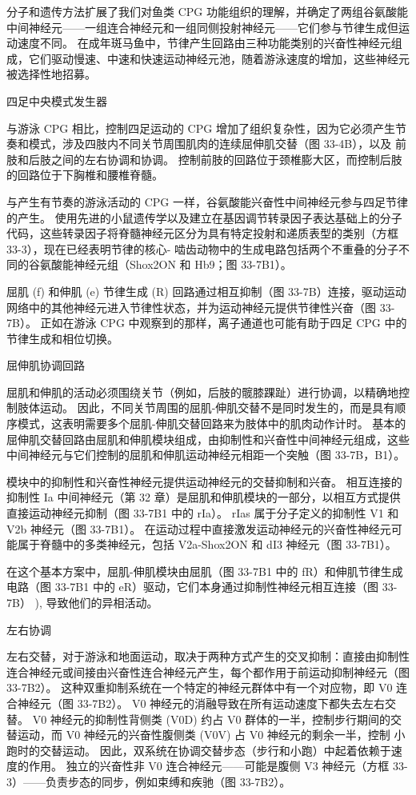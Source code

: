 分子和遗传方法扩展了我们对鱼类 CPG 功能组织的理解，并确定了两组谷氨酸能中间神经元——一组连合神经元和一组同侧投射神经元——它们参与节律生成但运动速度不同。 在成年斑马鱼中，节律产生回路由三种功能类别的兴奋性神经元组成，它们驱动慢速、中速和快速运动神经元池，随着游泳速度的增加，这些神经元被选择性地招募。

四足中央模式发生器

与游泳 CPG 相比，控制四足运动的 CPG 增加了组织复杂性，因为它必须产生节奏和模式，涉及四肢内不同关节周围肌肉的连续屈伸肌交替（图 33-4B），以及 前肢和后肢之间的左右协调和协调。 控制前肢的回路位于颈椎膨大区，而控制后肢的回路位于下胸椎和腰椎脊髓。

与产生有节奏的游泳活动的 CPG 一样，谷氨酸能兴奋性中间神经元参与四足节律的产生。 使用先进的小鼠遗传学以及建立在基因调节转录因子表达基础上的分子代码，这些转录因子将脊髓神经元区分为具有特定投射和递质表型的类别（方框 33-3），现在已经表明节律的核心- 啮齿动物中的生成电路包括两个不重叠的分子不同的谷氨酸能神经元组（Shox2ON 和 Hb9；图 33-7B1）。

屈肌 (f) 和伸肌 (e) 节律生成 (R) 回路通过相互抑制（图 33-7B）连接，驱动运动网络中的其他神经元进入节律性状态，并为运动神经元提供节律性兴奋（图 33-7B）。 正如在游泳 CPG 中观察到的那样，离子通道也可能有助于四足 CPG 中的节律生成和相位切换。

屈伸肌协调回路

屈肌和伸肌的活动必须围绕关节（例如，后肢的髋膝踝趾）进行协调，以精确地控制肢体运动。 因此，不同关节周围的屈肌-伸肌交替不是同时发生的，而是具有顺序模式，这表明需要多个屈肌-伸肌交替回路来为肢体中的肌肉动作计时。 基本的屈伸肌交替回路由屈肌和伸肌模块组成，由抑制性和兴奋性中间神经元组成，这些中间神经元与它们控制的屈肌和伸肌运动神经元相距一个突触（图 33-7B，B1）。

模块中的抑制性和兴奋性神经元提供运动神经元的交替抑制和兴奋。 相互连接的抑制性 Ia 中间神经元（第 32 章）是屈肌和伸肌模块的一部分，以相互方式提供直接运动神经元抑制（图 33-7B1 中的 rIa）。 rIas 属于分子定义的抑制性 V1 和 V2b 神经元（图 33-7B1）。 在运动过程中直接激发运动神经元的兴奋性神经元可能属于脊髓中的多类神经元，包括 V2a-Shox2ON 和 dI3 神经元（图 33-7B1）。

在这个基本方案中，屈肌-伸肌模块由屈肌（图 33-7B1 中的 fR）和伸肌节律生成电路（图 33-7B1 中的 eR）驱动，它们本身通过抑制性神经元相互连接（图 33-7B） ), 导致他们的异相活动。

左右协调

左右交替，对于游泳和地面运动，取决于两种方式产生的交叉抑制：直接由抑制性连合神经元或间接由兴奋性连合神经元产生，每个都作用于前运动抑制神经元（图 33-7B2）。 这种双重抑制系统在一个特定的神经元群体中有一个对应物，即 V0 连合神经元（图 33-7B2）。 V0 神经元的消融导致在所有运动速度下都失去左右交替。 V0 神经元的抑制性背侧类 (V0D) 约占 V0 群体的一半，控制步行期间的交替运动，而 V0 神经元的兴奋性腹侧类 (V0V) 占 V0 神经元的剩余一半，控制 小跑时的交替运动。 因此，双系统在协调交替步态（步行和小跑）中起着依赖于速度的作用。 独立的兴奋性非 V0 连合神经元——可能是腹侧 V3 神经元（方框 33-3）——负责步态的同步，例如束缚和疾驰（图 33-7B2）。

